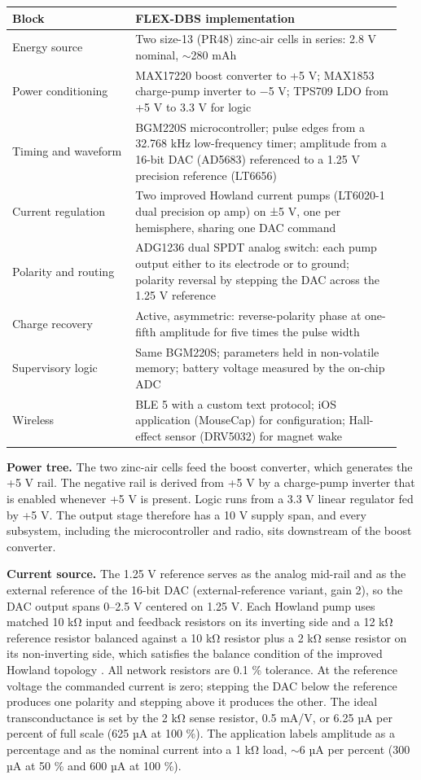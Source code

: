 \begin{longtable}{@{}>{\raggedright\arraybackslash{}}p{0.3\linewidth}>{\raggedright\arraybackslash{}}p{0.65\linewidth}@{}}
\toprule
Block & FLEX-DBS implementation \\
\midrule
\endhead
Energy source & Two size-13 (PR48) zinc-air cells in series: 2.8 V nominal, $\sim$280 mAh \\
Power conditioning & MAX17220 boost converter to +5 V; MAX1853 charge-pump inverter to −5 V; TPS709 LDO from +5 V to 3.3 V for logic \\
Timing and waveform & BGM220S microcontroller; pulse edges from a 32.768 kHz low-frequency timer; amplitude from a 16-bit DAC (AD5683) referenced to a 1.25 V precision reference (LT6656) \\
Current regulation & Two improved Howland current pumps (LT6020-1 dual precision op amp) on ±5 V, one per hemisphere, sharing one DAC command \\
Polarity and routing & ADG1236 dual SPDT analog switch: each pump output either to its electrode or to ground; polarity reversal by stepping the DAC across the 1.25 V reference \\
Charge recovery & Active, asymmetric: reverse-polarity phase at one-fifth amplitude for five times the pulse width \\
Supervisory logic & Same BGM220S; parameters held in non-volatile memory; battery voltage measured by the on-chip ADC \\
Wireless & BLE 5 with a custom text protocol; iOS application (MouseCap) for configuration; Hall-effect sensor (DRV5032) for magnet wake \\
\bottomrule
\end{longtable}

\textbf{Power tree.} The two zinc-air cells feed the boost converter, which generates the +5 V rail. The negative rail is derived from +5 V by a charge-pump inverter that is enabled whenever +5 V is present. Logic runs from a 3.3 V linear regulator fed by +5 V. The output stage therefore has a 10 V supply span, and every subsystem, including the microcontroller and radio, sits downstream of the boost converter.

\textbf{Current source.} The 1.25 V reference serves as the analog mid-rail and as the external reference of the 16-bit DAC (external-reference variant, gain 2), so the DAC output spans 0--2.5 V centered on 1.25 V. Each Howland pump uses matched 10 kΩ input and feedback resistors on its inverting side and a 12 kΩ reference resistor balanced against a 10 kΩ resistor plus a 2 kΩ sense resistor on its non-inverting side, which satisfies the balance condition of the improved Howland topology \citep{ti2008howland}. All network resistors are 0.1 \% tolerance. At the reference voltage the commanded current is zero; stepping the DAC below the reference produces one polarity and stepping above it produces the other. The ideal transconductance is set by the 2 kΩ sense resistor, 0.5 mA/V, or 6.25 µA per percent of full scale (625 µA at 100 \%). The application labels amplitude as a percentage and as the nominal current into a 1 kΩ load, $\sim$6 µA per percent (300 µA at 50 \% and 600 µA at 100 \%).

